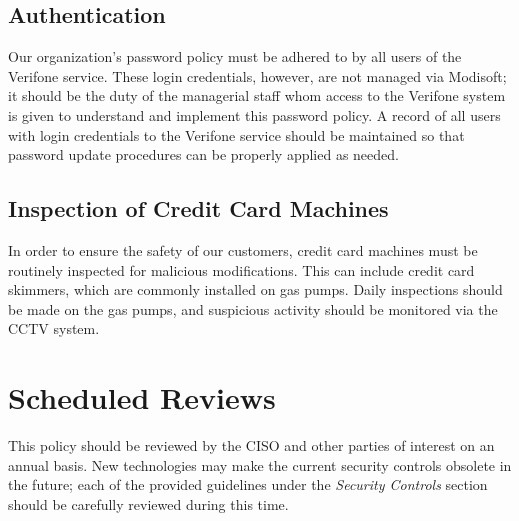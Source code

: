 \documentclass[11pt]{article}
\begin{document}
\subsection{Authentication}
\label{sec:orgb62e598}
Our organization's password policy must be adhered to by all users of the Verifone service. These login credentials, however, are not managed via Modisoft; it should be the duty of the managerial staff whom access to the Verifone system is given to understand and implement this password policy. A record of all users with login credentials to the Verifone service should be maintained so that password update procedures can be properly applied as needed.

\subsection{Inspection of Credit Card Machines}
\label{sec:orgf53a46d}
In order to ensure the safety of our customers, credit card machines must be routinely inspected for malicious modifications. This can include credit card skimmers, which are commonly installed on gas pumps. Daily inspections should be made on the gas pumps, and suspicious activity should be monitored via the CCTV system.

\section{Scheduled Reviews}
\label{sec:org36d2363}
This policy should be reviewed by the CISO and other parties of interest on an annual basis. New technologies may make the current security controls obsolete in the future; each of the provided guidelines under the \emph{Security Controls} section should be carefully reviewed during this time.
\end{document}
